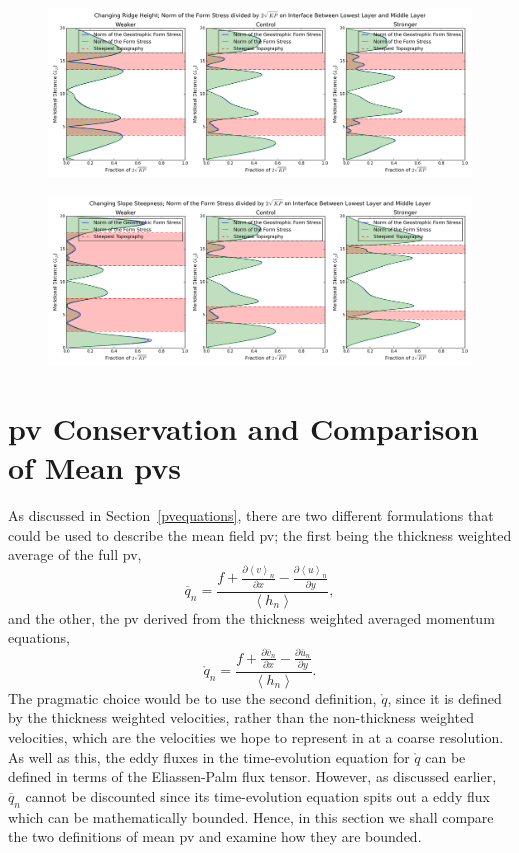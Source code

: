 \documentclass[12pt,a4paper]{report}
\newcommand*\thkmean[1]{\overline{#1}}
\newcommand*\nthkmean[1]{\left\langle{#1}\right\rangle}
\newcommand*\spec[1]{\mathring{#1}}
\newcommand*\secref[1]{Section~\ref{#1}}
\newcommand*{\partialdiff}[2][{}]{\frac{\partial #1}{\partial #2}}
\begin{document}
\begin{figure}
	\centering
	\includegraphics[width=\linewidth]{vformnormoverbound_1_0}
	\caption{ }
\end{figure}

\begin{figure}
	\centering
	\includegraphics[width=\linewidth]{vformnormoverbound_2_0}
	\caption{ }
\end{figure}


\section{\gls{pv} Conservation and Comparison of Mean \glspl{pv}}

As discussed in \secref{pvequations}, there are two different formulations that could
be used to describe the mean field \gls{pv}; the first being the thickness weighted average
of the full \gls{pv},
\begin{equation*}
\thkmean{q}_{n} =
\frac{f+\partialdiff[\nthkmean{v}_{n}]{x}-\partialdiff[\nthkmean{u}_{n}]{y}}
{\nthkmean{h_{n}}},
\end{equation*} 
and the other, the \gls{pv} derived from the thickness weighted averaged momentum equations,
\begin{equation*}
\spec{q}_{n} =
\frac{f+\partialdiff[\thkmean{v}_{n}]{x}-\partialdiff[\thkmean{u}_{n}]{y}}
{\nthkmean{h_{n}}}.
\end{equation*} 
The pragmatic choice would be to use the second definition, $\spec{q}$, since it is defined by
the thickness weighted velocities, rather than the non-thickness weighted velocities,
which are the velocities we hope to represent in at a coarse resolution. As well as this,
the eddy fluxes in the time-evolution equation for $\spec{q}$ can be defined in terms of the
Eliassen-Palm flux tensor. However, as discussed earlier, $\thkmean{q}_{n}$ cannot be
 discounted since its time-evolution equation spits out a eddy flux which can be
 mathematically bounded. Hence, in this section we shall compare the two definitions
 of mean \gls{pv} and examine how they are bounded. 
 
\end{document}
